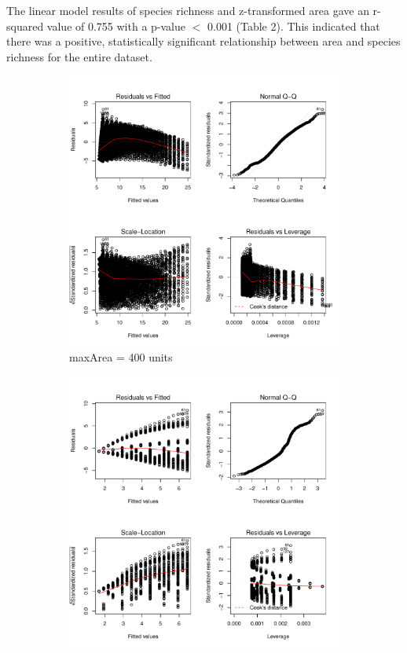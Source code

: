 \documentclass{article}
\begin{document}
\noindent The linear model results of species richness and z-transformed area gave an r-squared value of 0.755 with a p-value $<$ 0.001 (Table 2). This indicated that there was a positive, statistically significant relationship between area and species richness for the entire dataset. \bigskip

\begin{figure}[h!]
  \centering
  \begin{subfigure}[b]{0.4\linewidth}
    \includegraphics[width=\linewidth]{../../Results/Simulation/AreaSpeciesLmPlot_1.pdf}
    \caption{maxArea = 400 units}
  \end{subfigure}
  \begin{subfigure}[b]{0.4\linewidth}
    \includegraphics[width=\linewidth]{../../Results/Simulation/AreaSpeciesLmPlot_20.pdf}

\end{subfigure}
\end{figure}
\end{document}
